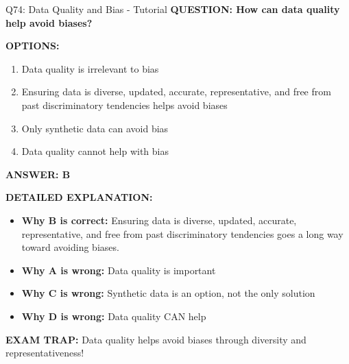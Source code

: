 \documentclass[8pt]{beamer}
\begin{document}
	\begin{frame}{Q74: Data Quality and Bias - Tutorial}
		\fontsize{6.5}{7.5}\selectfont
		\textbf{QUESTION: How can data quality help avoid biases?}
		
		\vspace{0.1cm}
		\textbf{OPTIONS:}
		\begin{enumerate}
			\item Data quality is irrelevant to bias
			\item Ensuring data is diverse, updated, accurate, representative, and free from past discriminatory tendencies helps avoid biases
			\item Only synthetic data can avoid bias
			\item Data quality cannot help with bias
		\end{enumerate}
		
		\vspace{0.1cm}
		\textcolor{myblue}{\textbf{ANSWER: B}}
		
		\vspace{0.1cm}
		\textbf{DETAILED EXPLANATION:}
		\begin{itemize}
			\item \textbf{Why B is correct:} Ensuring data is diverse, updated, accurate, representative, and free from past discriminatory tendencies goes a long way toward avoiding biases.
			\item \textbf{Why A is wrong:} Data quality is important
			\item \textbf{Why C is wrong:} Synthetic data is an option, not the only solution
			\item \textbf{Why D is wrong:} Data quality CAN help
		\end{itemize}
		
		\textcolor{myred}{\textbf{EXAM TRAP:}} Data quality helps \textcolor{myblue}{avoid biases} through diversity and representativeness!
	\end{frame}
	
\end{document}
